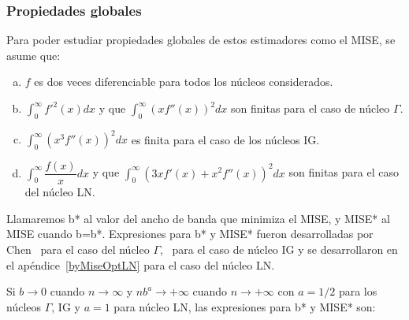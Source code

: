 \subsubsection{Propiedades globales}
\label{PropiedadesGlobales}

Para poder estudiar propiedades globales de estos estimadores como el MISE, se asume que:

\begin{enumerate}[a)]
	\label{CondPropGlobales}
	\item $f$ es dos veces diferenciable para todos los núcleos considerados.
	\item $\displaystyle{\int_0^{\infty}}  f'^2(x) dx$ y que $\displaystyle{\int_0^{\infty}}  (x f''(x))^2 dx$ son finitas para el caso de núcleo $\Gamma$.
	\item $\displaystyle{\int_0^{\infty}}  (x^3 f''(x))^2 dx$ es finita para el caso de los núcleos IG.
	\item $\displaystyle{\int_0^{\infty}}  \dfrac{f(x)}{x} dx$ y que $\displaystyle{\int_0^{\infty}}  (3 x f'(x)+x^2 f''(x))^2 dx$ son finitas para el caso del núcleo LN.
\end{enumerate}

Llamaremos b* al valor del ancho de banda que minimiza el MISE, y MISE* al MISE cuando b=b*. Expresiones para b* y MISE* fueron desarrolladas por Chen~\cite{chensx2000} para el caso del núcleo $\Gamma$,~\cite{Scaillet2004} para el caso de núcleo IG  y se desarrollaron en el apéndice~\ref{byMiseOptLN} para el caso del núcleo LN. 

Si $b \to 0$ cuando $n \to \infty$ y $n b^a \to +\infty$ cuando $n \to +\infty$ con $a=1/2$ para los núcleos $\Gamma$, IG y $a=1$ para núcleo LN, las expresiones para b* y MISE* son:

